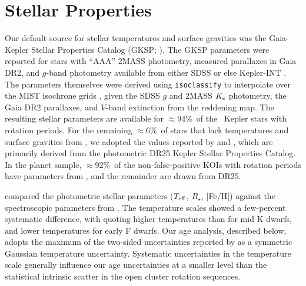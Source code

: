 \documentclass[11pt,twocolumn,tighten,linenumbers,trackchanges]{aastex63}
\newcommand{\fracstarswithprotwithbtwenty}{{$\approx$94\%}}
\newcommand{\fracstarswithprotwithoutbtwenty}{{$\approx$6\%}}
\newcommand{\frackoisnofpwithprotwithbtwenty}{{$\approx$92\%}}
\begin{document}
\section{Stellar Properties}
\label{sec:stellarprops}




Our default source for stellar temperatures and surface gravities was
the Gaia-Kepler Stellar Properties Catalog (GKSP;
\citealt{Berger_2020a_catalog}).  The GKSP parameters were reported
for stars with ``AAA'' 2MASS photometry, measured parallaxes in Gaia
DR2,  and $g$-band photometry available from either SDSS or else
Kepler-INT \citep{2012AJ....144...24G}.  The parameters themselves
were derived using \texttt{isoclassify} \citep{2017ApJ...844..102H} to
interpolate over the MIST isochrone grids
\citep{Choi_2016,2016ApJS..222....8D}, given the SDSS $g$ and 2MASS
$K_{\rm s}$ photometry, the Gaia DR2 parallaxes, and $V$-band
extinction from the \citet{2019ApJ...887...93G} reddening map.  The
resulting stellar parameters are available for
\fracstarswithprotwithbtwenty\ of the \nuniqstarsantosrot\ Kepler
stars with rotation periods.  For the remaining
\fracstarswithprotwithoutbtwenty\ of stars that lack temperatures and
surface gravities from , we adopted
the values reported by \citet{Santos_2019} and \citet{Santos_2021},
which are primarily derived from the photometric \citet{Mathur_2017}
DR25 Kepler Stellar Properties Catalog.  In the planet sample,
\frackoisnofpwithprotwithbtwenty\ of the non-false-positive KOIs with
rotation periods have parameters from \citet{Berger_2020a_catalog},
and the remainder are drawn from DR25. 

\citet{David_2021} compared the photometric
 stellar parameters ($T_{\rm eff}$,
$R_\star$, [Fe/H]) against the spectroscopic parameters from
\citet{Fulton_2018}.  The temperature scales showed a few-percent
systematic difference, with  quoting higher
temperatures than  for mid K dwarfs,
and lower temperatures for early F dwarfs.  Our age analysis,
described below, adopts the maximum of the two-sided uncertainties
reported by  as a symmetric Gaussian
temperature uncertainty.  Systematic uncertainties in the temperature
scale generally influence our age uncertainties at a smaller level
than the statistical intrinsic scatter in the open cluster rotation
sequences.
\end{document}
